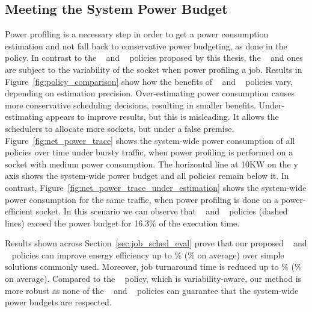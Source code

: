 \subsection{Meeting the System Power Budget}
\label{sec:budget}
Power profiling is a necessary step in order to get a power consumption estimation and not fall back to conservative power budgeting, as done in the \DefaultSched~ policy.  
In contrast to the \PRVSSched~ and \PMCVSSched~ policies proposed by this thesis, the \PESched~ and \PEVASched ones are subject to the variability of the socket when power profiling a job.  
Results in Figure~\ref{fig:policy_comparison} show how the benefits of \PESched~ and \PEVASched~ policies vary, depending on estimation precision.  
Over-estimating
power consumption causes more conservative scheduling decisions, resulting in smaller benefits.  
Under-estimating appears to improve results, but this is misleading.
It allows the schedulers to allocate more sockets, but under a false premise. 
Figure~\ref{fig:net_power_trace} shows the system-wide power consumption of all policies over time under bursty traffic,
when power profiling is performed on a socket with medium power consumption. 
The horizontal line at 10KW on the y axis shows the system-wide power budget and all policies remain below it.
In contrast, Figure~\ref{fig:net_power_trace_under_estimation} shows the system-wide power consumption for the same traffic, when power profiling is done on a power-efficient socket.  
In this scenario we can observe that
\PESched~ and \PEVASched~ policies (dashed lines) exceed the power budget for 16.3\% of the execution time.

Results shown across Section~\ref{sec:job_sched_eval} prove that our proposed \PRVSSched~ and \PMCVSSched~ policies can improve energy efficiency up to \MaxEnergy\% (\AvgEnergy\% on average) over 
simple solutions commonly used. 
Moreover, job turnaround time is reduced up to \MaxJTT\% (\AvgJTT\% on average).
Compared to the \PEVASched~ policy, which is variability-aware, our method is more robust  
as none of the  \PESched~ and \PEVASched~ policies
can guarantee that the system-wide power budgets are respected. 
